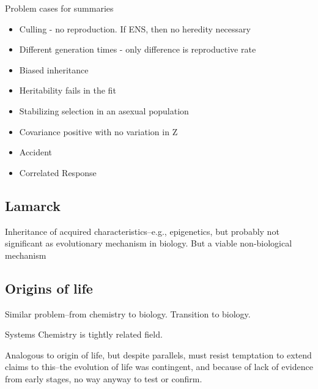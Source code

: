 \begin{itemize}
	Problem cases for summaries
	
	
	\begin{itemize}
		\item
		
		Culling - no reproduction. If ENS, then no heredity necessary
		
		\item
		
		Different generation times - only difference is reproductive rate
		
		\item
		
		Biased inheritance
		
		\item
		
		Heritability fails in the fit
		
		\item
		
		Stabilizing selection in an asexual population
		
		\item
		
		Covariance positive with no variation in Z
		
		\item
		
		Accident
		
		\item
		
		Correlated Response
		
	\end{itemize}
\end{itemize}


\subsection{Lamarck}\label{lamarck}

Inheritance of acquired characteristics--e.g., epigenetics, but probably not significant as evolutionary mechanism in biology. But a viable non-biological mechanism

\subsection{Origins of life}
Similar problem--from chemistry to biology. Transition to biology.

Systems Chemistry is tightly related field.

Analogous to origin of life, but despite parallels, must resist temptation to extend claims to this--the evolution of life was contingent, and because of lack of evidence from early stages, no way anyway to test or confirm.


